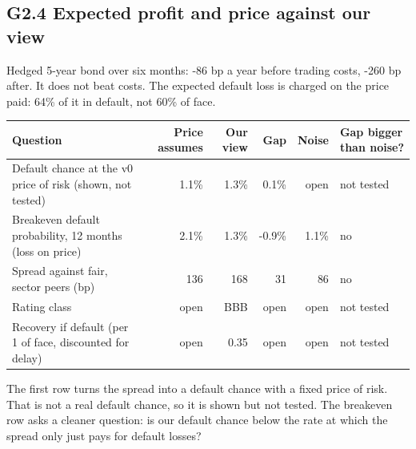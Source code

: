 \documentclass[11pt,a4paper]{article}
\begin{document}
\subsection*{G2.4 Expected profit and price against our view}
Hedged 5-year bond over six months: -86 bp a year before trading costs, -260 bp after. It does not beat costs. The expected default loss is charged on the price paid: 64\% of it in default, not 60\% of face.
\begin{center}\footnotesize\setlength{\tabcolsep}{3.5pt}\begin{tabular}{@{}p{5.2cm}rrrrl@{}}\toprule
Question & Price assumes & Our view & Gap & Noise & Gap bigger than noise? \\\midrule
Default chance at the v0 price of risk (shown, not tested) & 1.1\% & 1.3\% & 0.1\% & open & not tested \\
Breakeven default probability, 12 months (loss on price) & 2.1\% & 1.3\% & -0.9\% & 1.1\% & no \\
Spread against fair, sector peers (bp) & 136 & 168 & 31 & 86 & no \\
Rating class & open & BBB & open & open & not tested \\
Recovery if default (per 1 of face, discounted for delay) & open & 0.35 & open & open & not tested \\
\bottomrule\end{tabular}\end{center}
The first row turns the spread into a default chance with a fixed price of risk. That is not a real default chance, so it is shown but not tested. The breakeven row asks a cleaner question: is our default chance below the rate at which the spread only just pays for default losses?
\end{document}
